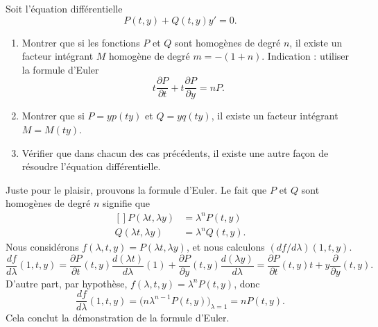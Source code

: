 

\begin{exercice}\label{exo_II-1-12}

Soit l'équation différentielle
\begin{equation}
	P(t,y)+Q(t,y)y'=0.
\end{equation}
\begin{enumerate}
\item
Montrer que si les fonctions $P$ et $Q$ sont homogènes de degré $n$, il existe un facteur intégrant $M$ homogène de degré $m=-(1+n)$. Indication : utiliser la formule d'Euler
\begin{equation}
	t\frac{ \partial P }{ \partial t }+t\frac{ \partial P }{ \partial y }=nP.
\end{equation}

\item
Montrer que si $P=yp(ty)$ et $Q=yq(ty)$, il existe un facteur intégrant $M=M(ty)$.

\item
Vérifier que dans chacun des cas précédents, il existe une autre façon de résoudre l'équation différentielle.

\end{enumerate}

\end{exercice}

Juste pour le plaisir, prouvons la formule d'Euler. Le fait que $P$ et $Q$ sont homogènes de degré $n$ signifie que
\begin{equation}
	\begin{aligned}[]
		P(\lambda t,\lambda y)	&=\lambda^nP(t,y)\\
		Q(\lambda t,\lambda y)	&=\lambda^nQ(t,y).
	\end{aligned}
\end{equation}
Nous considérons $f(\lambda,t,y)=P(\lambda t,\lambda y)$, et nous calculons $(df/d\lambda)(1,t,y)$.
\begin{equation}
	\frac{ df }{ d\lambda }(1,t,y)=\frac{ \partial P }{ \partial t }(t,y)\frac{ d(\lambda t) }{ d\lambda }(1)+\frac{ \partial P }{ \partial y }(t,y)\frac{ d(\lambda y) }{ d\lambda }=\frac{ \partial P }{ \partial t }(t,y)t+y\frac{ \partial  }{ \partial y }(t,y).
\end{equation}
D'autre part, par hypothèse, $f(\lambda,t,y)=\lambda^nP(t,y)$, donc
\begin{equation}
	\frac{ df }{ d\lambda }(1,t,y)=\big( n\lambda^{n-1}P(t,y) \big)_{\lambda=1}=nP(t,y).
\end{equation}
Cela conclut la démonstration de la formule d'Euler.
